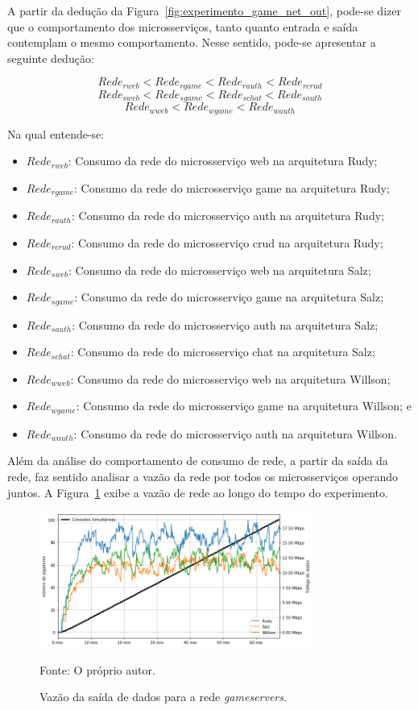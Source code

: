 A partir da dedução da Figura~\ref{fig:experimento_game_net_out}, pode-se dizer que o comportamento dos microsserviços, tanto quanto entrada e saída contemplam o mesmo comportamento.
%
Nesse sentido, pode-se apresentar a seguinte dedução:

$$
     Rede_{rweb} < Rede_{rgame} < Rede_{rauth} < Rede_{rcrud}
$$
$$
     Rede_{sweb} < Rede_{sgame} < Rede_{schat} < Rede_{sauth}
$$
$$
     Rede_{wweb} < Rede_{wgame} < Rede_{wauth}
$$

Na qual entende-se:

\begin{itemize}
 \item $Rede_{rweb}$: Consumo da rede do microsserviço web na arquitetura Rudy;
 \item $Rede_{rgame}$: Consumo da rede do microsserviço game na arquitetura Rudy;
 \item $Rede_{rauth}$: Consumo da rede do microsserviço auth na arquitetura Rudy;
 \item $Rede_{rcrud}$: Consumo da rede do microsserviço crud na arquitetura Rudy;
  \item $Rede_{sweb}$: Consumo da rede do microsserviço web na arquitetura Salz;
 \item $Rede_{sgame}$: Consumo da rede do microsserviço game na arquitetura Salz;
 \item $Rede_{sauth}$: Consumo da rede do microsserviço auth na arquitetura Salz;
 \item $Rede_{schat}$: Consumo da rede do microsserviço chat na arquitetura Salz;
 \item $Rede_{wweb}$: Consumo da rede do microsserviço web na arquitetura Willson;
 \item $Rede_{wgame}$: Consumo da rede do microsserviço game na arquitetura Willson; e
 \item $Rede_{wauth}$: Consumo da rede do microsserviço auth na arquitetura Willson.
\end{itemize}

Além da análise do comportamento de consumo de rede, a partir da saída da rede, faz sentido analisar a vazão da rede por todos os microsserviços operando juntos.
%
A Figura~\ref{fig:net_in_gs} exibe a vazão de rede ao longo do tempo do experimento.

\begin{figure}[htb!]
  \caption{Vazão da saída de dados para a rede \textit{gameservers}.}
  \label{fig:net_in_gs}
  \includegraphics[width=0.8\textwidth]{figuras/analise/net_in_gs.png}
  \centering

  Fonte: O próprio autor.
\end{figure}

